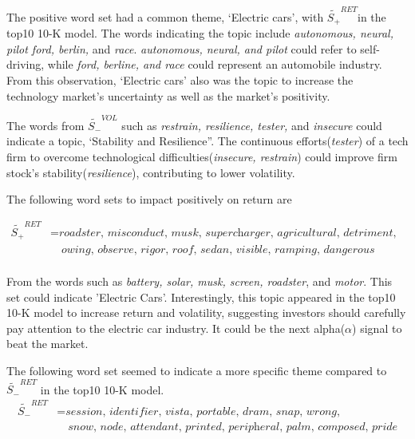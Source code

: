 \documentclass[logo,bsc,singlespacing,parskip]{infthesis}
\begin{document}
The positive word set had a common theme, ‘Electric cars’, with $\tilde{S_{+}}^{RET}$in the top10 10-K model. The words indicating the topic include \textit{autonomous, neural, pilot ford, berlin,} and \textit{race}. \textit{autonomous, neural, and pilot} could refer to self-driving, while \textit{ford, berline, and race} could represent an automobile industry. From this observation, ‘Electric cars’ also was the topic to increase the technology market’s uncertainty as well as the market’s positivity.

The words from $\tilde{S_{-}}^{VOL}$ such as \textit{restrain, resilience, tester,} and \textit{insecure} could indicate a topic, ‘Stability and Resilience”. The continuous efforts(\textit{tester}) of a tech firm to overcome technological difficulties(\textit{insecure, restrain}) could improve firm stock’s stability(\textit{resilience}), contributing to lower volatility. 




The following word sets to impact positively on return are

\begin{align*}
\tilde{S_{+}}^{RET} &= \textit{roadster, misconduct, musk, supercharger, agricultural, detriment, cluster, } \\
               &\quad \textit{owing, observe, rigor, roof, sedan, visible, ramping, dangerous} \\
\end{align*}

From the words such as \textit{battery, solar, musk, screen, roadster}, and \textit{motor}. This set could indicate 'Electric Cars'. Interestingly, this topic appeared in the top10 10-K model to increase return and volatility, suggesting investors should carefully pay attention to the electric car industry. It could be the next alpha($\alpha$) signal to beat the market. 


The following word set seemed to indicate a more specific theme compared to $\tilde{S_{-}}^{RET}$ in the top10 10-K model. 
\begin{align*}
\tilde{S_{-}}^{RET} &= \textit{session, identifier, vista, portable, dram, snap, wrong,} \\
               &\quad \textit{snow, node, attendant, printed, peripheral, palm, composed, pride} \\
\end{align*}
\end{document}
